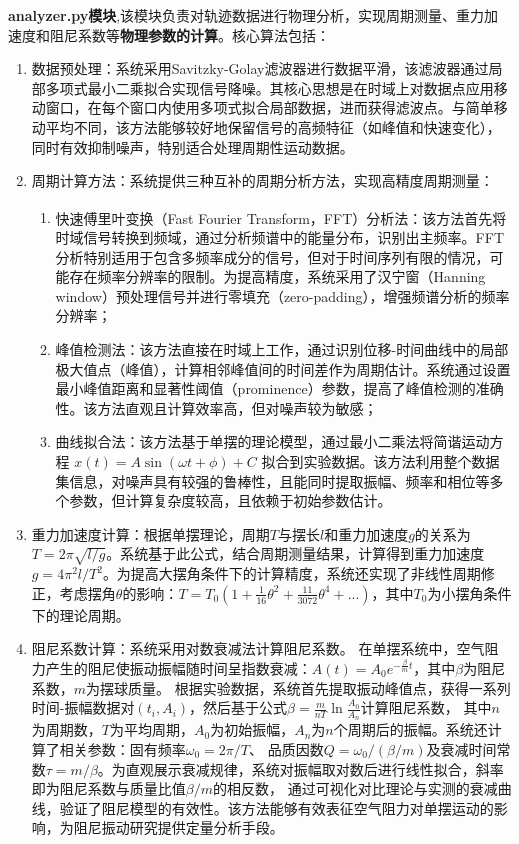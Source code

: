 \textbf{analyzer.py模块},该模块负责对轨迹数据进行物理分析，实现周期测量、重力加速度和阻尼系数等\textbf{物理参数的计算}。核心算法包括：
\begin{enumerate}
\item 数据预处理：系统采用Savitzky-Golay滤波器进行数据平滑，该滤波器通过局部多项式最小二乘拟合实现信号降噪。其核心思想是在时域上对数据点应用移动窗口，在每个窗口内使用多项式拟合局部数据，进而获得滤波点。与简单移动平均不同，该方法能够较好地保留信号的高频特征（如峰值和快速变化），同时有效抑制噪声，特别适合处理周期性运动数据。
    
\item 周期计算方法：系统提供三种互补的周期分析方法，实现高精度周期测量：
    \begin{enumerate}[label=\alph*.]
        \item 快速傅里叶变换（Fast Fourier Transform，FFT）分析法\textsuperscript{\cite{9787115284846001}}：该方法首先将时域信号转换到频域，通过分析频谱中的能量分布，识别出主频率。FFT分析特别适用于包含多频率成分的信号，但对于时间序列有限的情况，可能存在频率分辨率的限制。为提高精度，系统采用了汉宁窗（Hanning window）预处理信号并进行零填充（zero-padding），增强频谱分析的频率分辨率；
        
        \item 峰值检测法：该方法直接在时域上工作，通过识别位移-时间曲线中的局部极大值点（峰值），计算相邻峰值间的时间差作为周期估计。系统通过设置最小峰值距离和显著性阈值（prominence）参数，提高了峰值检测的准确性。该方法直观且计算效率高，但对噪声较为敏感；
        
        \item 曲线拟合法：该方法基于单摆的理论模型，通过最小二乘法将简谐运动方程 $x(t) = A\sin(\omega t + \phi) + C$ 拟合到实验数据。该方法利用整个数据集信息，对噪声具有较强的鲁棒性，且能同时提取振幅、频率和相位等多个参数，但计算复杂度较高，且依赖于初始参数估计。
    \end{enumerate}
    
  
\item 重力加速度计算：根据单摆理论，周期$T$与摆长$l$和重力加速度$g$的关系为$T = 2\pi\sqrt{l/g}$。系统基于此公式，结合周期测量结果，计算得到重力加速度$g = 4\pi^2l/T^2$。为提高大摆角条件下的计算精度，系统还实现了非线性周期修正，考虑摆角$\theta$的影响：$T = T_0(1 + \frac{1}{16}\theta^2 + \frac{11}{3072}\theta^4 + ...)$，其中$T_0$为小摆角条件下的理论周期。
    
\item 阻尼系数计算：系统采用对数衰减法计算阻尼系数。
    在单摆系统中，空气阻力产生的阻尼使振动振幅随时间呈指数衰减：$A(t) = A_0e^{-\frac{\beta}{m} t}$，其中$\beta$为阻尼系数，$m$为摆球质量。
    根据实验数据，系统首先提取振动峰值点，获得一系列时间-振幅数据对$(t_i, A_i)$，然后基于公式$\beta = \frac{m}{nT}\ln\frac{A_0}{A_n}$计算阻尼系数，
    其中$n$为周期数，$T$为平均周期，$A_0$为初始振幅，$A_n$为$n$个周期后的振幅。系统还计算了相关参数：固有频率$\omega_0 = 2\pi/T$、
    品质因数$Q = \omega_0/(\beta/m)$及衰减时间常数$\tau = m/\beta$。为直观展示衰减规律，系统对振幅取对数后进行线性拟合，斜率即为阻尼系数与质量比值$\beta/m$的相反数，
    通过可视化对比理论与实测的衰减曲线，验证了阻尼模型的有效性。该方法能够有效表征空气阻力对单摆运动的影响，为阻尼振动研究提供定量分析手段。
\end{enumerate}

